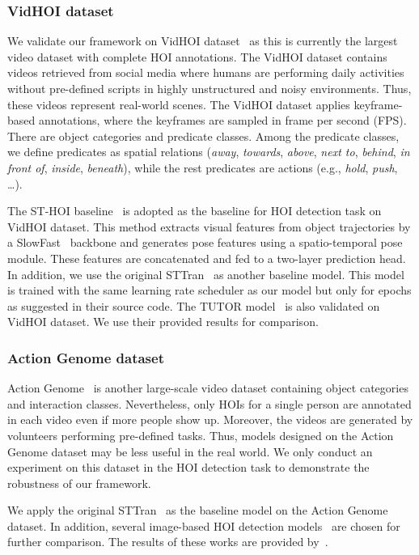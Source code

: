 \documentclass[times,twocolumn,final,authoryear]{elsarticle}
\begin{document}
\subsubsection{VidHOI dataset}
We validate our framework on VidHOI dataset~\citep{hoi_v_set:VidHOI} as this is currently the largest video dataset with complete HOI annotations. The VidHOI dataset contains videos retrieved from social media where humans are performing daily activities without pre-defined scripts in highly unstructured and noisy environments. Thus, these videos represent real-world scenes. The VidHOI dataset applies keyframe-based annotations, where the keyframes are sampled in  frame per second (FPS). There are  object categories and  predicate classes. Among the predicate classes, we define  predicates as spatial relations (\emph{away}, \emph{towards}, \emph{above}, \emph{next to}, \emph{behind}, \emph{in front of}, \emph{inside}, \emph{beneath}), while the rest  predicates are actions (e.g., \emph{hold}, \emph{push}, \dots). 

The ST-HOI baseline~\citep{hoi_v_set:VidHOI} is adopted as the baseline for HOI detection task on VidHOI dataset. This method extracts visual features from object trajectories by a SlowFast~\citep{cnn:slowfast} backbone and generates pose features using a spatio-temporal pose module. These features are concatenated and fed to a two-layer prediction head. In addition, we use the original STTran~\citep{hoi_v2:sttran} as another baseline model. This model is trained with the same learning rate scheduler as our model but only for  epochs as suggested in their source code. The TUTOR model~\citep{hoi_v2:tubelet_tokens} is also validated on VidHOI dataset. We use their provided results for comparison.

\subsubsection{Action Genome dataset}
Action Genome~\citep{hoi_v_set:action_genome} is another large-scale video dataset containing  object categories and  interaction classes. Nevertheless, only HOIs for a single person are annotated in each video even if more people show up. Moreover, the videos are generated by volunteers performing pre-defined tasks. Thus, models designed on the Action Genome dataset may be less useful in the real world. We only conduct an experiment on this dataset in the HOI detection task to demonstrate the robustness of our framework.

We apply the original STTran~\citep{hoi_v2:sttran} as the baseline model on the Action Genome dataset. In addition, several image-based HOI detection models~\citep{hoi_i2:language_prior, hoi_i2:msdn, hoi_i2:vctree, hoi_i2:reidn, hoi_i2:gpsnet} are chosen for further comparison. The results of these works are provided by~\citep{hoi_v2:sttran}.  
\end{document}
